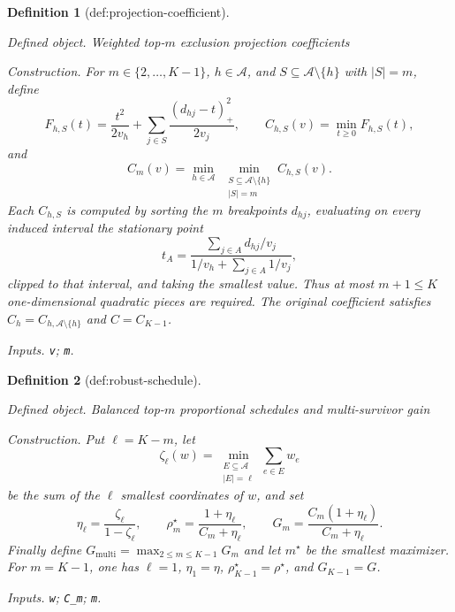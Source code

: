 \documentclass{article}
\newtheorem{definition}{Definition}
\begin{document}
\begin{definition}[def:projection-coefficient]\label{def:projection-coefficient}
\par\smallskip\noindent\emph{Defined object.} Weighted top-\(m\) exclusion projection coefficients
\par\smallskip\noindent\emph{Construction.} For \(m\in\{2,\ldots,K-1\}\), \(h\in\mathcal A\), and \(S\subseteq\mathcal A\setminus\{h\}\) with \(|S|=m\), define
\[
 F_{h,S}(t)=\frac{t^2}{2v_h}+\sum_{j\in S}\frac{(d_{hj}-t)_+^2}{2v_j},
 \qquad C_{h,S}(v)=\min_{t\ge0}F_{h,S}(t),
\]
and
\[
 C_m(v)=\min_{h\in\mathcal A}\ \min_{\substack{S\subseteq\mathcal A\setminus\{h\}\\|S|=m}}C_{h,S}(v).
\]
Each \(C_{h,S}\) is computed by sorting the \(m\) breakpoints \(d_{hj}\), evaluating on every induced interval the stationary point
\[
 t_A=\frac{\sum_{j\in A}d_{hj}/v_j}{1/v_h+\sum_{j\in A}1/v_j},
\]
clipped to that interval, and taking the smallest value. Thus at most \(m+1\le K\) one-dimensional quadratic pieces are required. The original coefficient satisfies \(C_h=C_{h,\mathcal A\setminus\{h\}}\) and \(C=C_{K-1}\).
\par\smallskip\noindent\emph{Inputs.} \texttt{v}; \texttt{m}.
\end{definition}

\begin{definition}[def:robust-schedule]\label{def:robust-schedule}
\par\smallskip\noindent\emph{Defined object.} Balanced top-\(m\) proportional schedules and multi-survivor gain
\par\smallskip\noindent\emph{Construction.} Put \(\ell=K-m\), let
\[
 \zeta_\ell(w)=\min_{\substack{E\subseteq\mathcal A\\|E|=\ell}}\sum_{e\in E}w_e
\]
be the sum of the \(\ell\) smallest coordinates of \(w\), and set
\[
 \eta_\ell=\frac{\zeta_\ell}{1-\zeta_\ell},\qquad
 \rho_m^\star=\frac{1+\eta_\ell}{C_m+\eta_\ell},\qquad
 G_m=\frac{C_m(1+\eta_\ell)}{C_m+\eta_\ell}.
\]
Finally define \(G_{\mathrm{multi}}=\max_{2\le m\le K-1}G_m\) and let \(m^\star\) be the smallest maximizer. For \(m=K-1\), one has \(\ell=1\), \(\eta_1=\eta\), \(\rho_{K-1}^\star=\rho^\star\), and \(G_{K-1}=G\).
\par\smallskip\noindent\emph{Inputs.} \texttt{w}; \texttt{C\_\allowbreak{}m}; \texttt{m}.
\end{definition}
\end{document}
